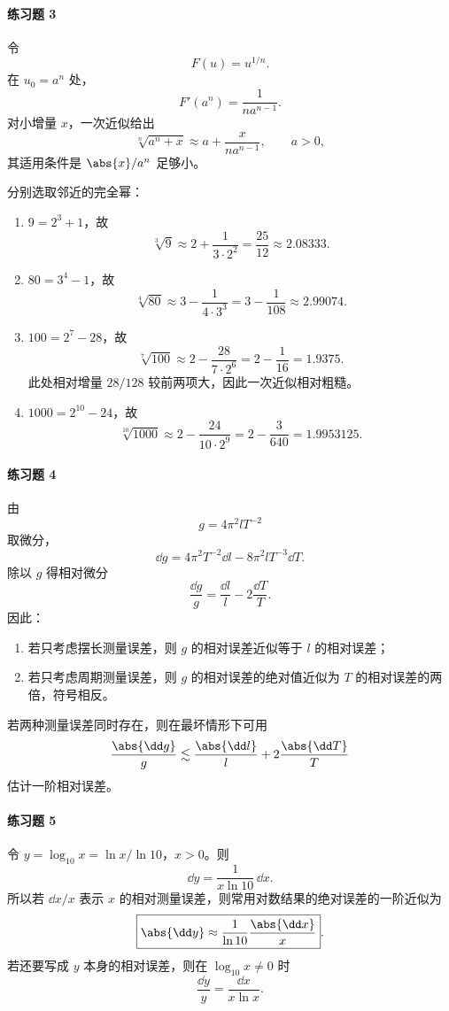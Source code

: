 \paragraph{练习题 3}
\begin{xsolution}
令
\[
  F(u)=u^{1/n}.
\]
在 $u_0=a^n$ 处，
\[
  F'(a^n)=\frac1{na^{n-1}}.
\]
对小增量 $x$，一次近似给出
\[
  \boxed{\sqrt[n]{a^n+x}\approx a+\frac{x}{na^{n-1}}},\qquad a>0,
\]
其适用条件是 $\abs{x}/a^n$ 足够小。

分别选取邻近的完全幂：
\begin{enumerate}[label=(\arabic*)]
  \item $9=2^3+1$，故
  \[
    \sqrt[3]{9}\approx2+\frac1{3\cdot2^2}=\frac{25}{12}\approx2.08333.
  \]
  \item $80=3^4-1$，故
  \[
    \sqrt[4]{80}\approx3-\frac1{4\cdot3^3}=3-\frac1{108}\approx2.99074.
  \]
  \item $100=2^7-28$，故
  \[
    \sqrt[7]{100}\approx2-\frac{28}{7\cdot2^6}=2-\frac1{16}=1.9375.
  \]
  此处相对增量 $28/128$ 较前两项大，因此一次近似相对粗糙。
  \item $1000=2^{10}-24$，故
  \[
    \sqrt[10]{1000}\approx2-\frac{24}{10\cdot2^9}=2-\frac3{640}=1.9953125.
  \]
\end{enumerate}
\end{xsolution}

\paragraph{练习题 4}
\begin{xsolution}
由
\[
  g=4\pi^2lT^{-2}
\]
取微分，
\[
  \dd g=4\pi^2T^{-2}\dd l-8\pi^2lT^{-3}\dd T.
\]
除以 $g$ 得相对微分
\[
  \boxed{\frac{\dd g}{g}=\frac{\dd l}{l}-2\frac{\dd T}{T}}.
\]
因此：
\begin{enumerate}[label=(\arabic*)]
  \item 若只考虑摆长测量误差，则 $g$ 的相对误差近似等于 $l$ 的相对误差；
  \item 若只考虑周期测量误差，则 $g$ 的相对误差的绝对值近似为 $T$ 的相对误差的两倍，符号相反。
\end{enumerate}
若两种测量误差同时存在，则在最坏情形下可用
\[
  \frac{\abs{\dd g}}g\lesssim \frac{\abs{\dd l}}l+2\frac{\abs{\dd T}}T
\]
估计一阶相对误差。
\end{xsolution}

\paragraph{练习题 5}
\begin{xsolution}
令 $y=\log_{10}x=\ln x/\ln10$，$x>0$。则
\[
  \dd y=\frac1{x\ln10}\,\dd x.
\]
所以若 $\dd x/x$ 表示 $x$ 的相对测量误差，则常用对数结果的绝对误差的一阶近似为
\[
  \boxed{\abs{\dd y}\approx\frac1{\ln10}\frac{\abs{\dd x}}x}.
\]
若还要写成 $y$ 本身的相对误差，则在 $\log_{10}x\ne0$ 时
\[
  \boxed{\frac{\dd y}{y}=\frac{\dd x}{x\ln x}}.
\]
\end{xsolution}

